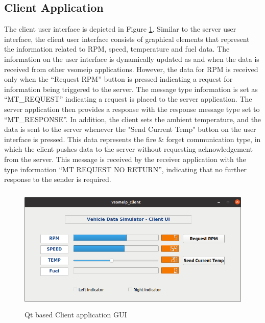 \subsection{Client Application}
The client user interface is depicted in Figure \ref{fig:clientUI}. Similar to the server user interface, the client user interface consists of graphical elements that represent the information related to RPM, speed, temperature and fuel data. The information on the user interface is dynamically updated as and when the data is received from other vsomeip applications. However, the data for RPM is received only when the “Request RPM” button is pressed indicating a request for information being triggered to the server. The message type information is set as “MT\_REQUEST” indicating a request is placed to the server application. The server application then provides a response with the response message type set to “MT\_RESPONSE”.  In addition, the client sets the ambient temperature, and the data is sent to the server whenever the "Send Current Temp" button on the user interface is pressed. This data represents the fire \& forget communication type, in which the client pushes data to the server without requesting acknowledgement from the server. This message is received by the receiver application with the type information “MT REQUEST NO RETURN”, indicating that no further response to the sender is required.

\begin{figure}[!htb] 

	\centering
		\includegraphics[width=1\textwidth,height=6cm]{images/clientUI.png}
	\caption{Qt based Client application GUI}
	\label{fig:clientUI}
\end{figure}

